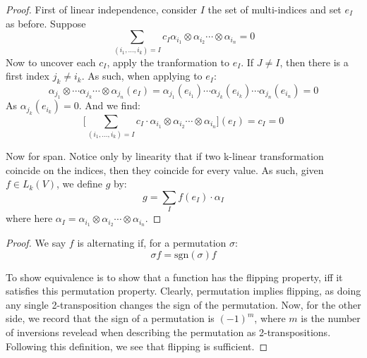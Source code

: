 \begin{problem}
\end{problem}
\begin{proof}
	First of linear independence, consider $I$ the set of multi-indices and set $e_I$ as before. Suppose
	$$\sum_{(i_1,\dots,i_k) = I} c_I \alpha_{i_1}\otimes\alpha_{i_2} \cdots \otimes\alpha_{i_n} = 0$$
	Now to uncover each $c_I$, apply the tranformation to $e_I$. If $J \neq I$, then there is a first index
	$j_k \neq i_k$. As such, when applying to $e_I$:
	$$\alpha_{j_1}\otimes \cdots \alpha_{j_k} \cdots \otimes\alpha_{j_n} (e_I) = \alpha_{j_1}(e_{i_1})\cdots \alpha_{j_k}(e_{i_k}) \cdots
		\alpha_{j_n}(e_{i_n}) = 0$$
	As  $\alpha_{j_k}(e_{i_k}) = 0$. And we find:
	$$\Bigg[\sum_{(i_1,\dots,i_k) = I} c_I \cdot \alpha_{i_1}\otimes\alpha_{i_2} \cdots \otimes\alpha_{i_n}\Bigg](e_I) = c_I = 0$$

	Now for span. Notice only by linearity that if two k-linear transformation coincide on the indices, then they coincide for every value.
	As such, given $f \in L_k(V)$, we define $g$ by:
	$$g = \sum_I f(e_I)\cdot\alpha_I$$
	where here $\alpha_I = \alpha_{i_1}\otimes\alpha_{i_2} \cdots \otimes\alpha_{i_n}$.
\end{proof}

\begin{problem}
\end{problem}
\begin{proof}
	We say $f$ is alternating if, for a permutation $\sigma$:
	$$\sigma f = \text{sgn}(\sigma) f$$

	To show equivalence is to show that  a function has the flipping property, iff it satisfies this permutation property.
	Clearly, permutation implies flipping, as doing any single 2-transposition changes the sign of the permutation. Now, for
	the other side, we record that the sign of a permutation is $(-1)^m$, where $m$ is the number of inversions revelead when
	describing the permutation as 2-transpositions. Following this definition, we see that flipping is sufficient.
\end{proof}

